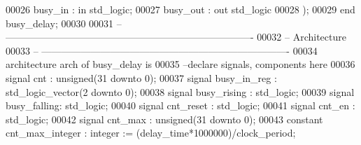 \begin{DoxyCode}
00026       \textcolor{vhdlchar}{busy_in}  \textcolor{vhdlchar}{:} \textcolor{keywordflow}{in}  \textcolor{comment}{std\_logic};
00027       \textcolor{vhdlchar}{busy_out} \textcolor{vhdlchar}{:} \textcolor{keywordflow}{out} \textcolor{comment}{std\_logic}
00028    \textcolor{vhdlchar}{)};
00029 \textcolor{keywordflow}{end} \textcolor{vhdlchar}{busy\_delay};
00030 
00031 \textcolor{keyword}{-- ----------------------------------------------------------------------------}
00032 \textcolor{keyword}{-- Architecture}
00033 \textcolor{keyword}{-- ----------------------------------------------------------------------------}
00034 \textcolor{keywordflow}{architecture} arch \textcolor{keywordflow}{of} busy_delay is
00035 \textcolor{keyword}{   --declare signals,  components here}
00036    \textcolor{keywordflow}{signal} \textcolor{vhdlchar}{cnt}         \textcolor{vhdlchar}{:} \textcolor{comment}{unsigned}\textcolor{vhdlchar}{(}\textcolor{vhdllogic}{}\textcolor{vhdllogic}{31} \textcolor{keywordflow}{downto} \textcolor{vhdllogic}{}\textcolor{vhdllogic}{0}\textcolor{vhdlchar}{)};
00037    \textcolor{keywordflow}{signal} \textcolor{vhdlchar}{busy_in_reg} \textcolor{vhdlchar}{:} \textcolor{comment}{std\_logic\_vector}\textcolor{vhdlchar}{(}\textcolor{vhdllogic}{}\textcolor{vhdllogic}{2} \textcolor{keywordflow}{downto} \textcolor{vhdllogic}{}\textcolor{vhdllogic}{0}\textcolor{vhdlchar}{)};
00038     \textcolor{keywordflow}{signal} \textcolor{vhdlchar}{busy_rising} \textcolor{vhdlchar}{:} \textcolor{comment}{std\_logic};
00039     \textcolor{keywordflow}{signal} \textcolor{vhdlchar}{busy_falling}\textcolor{vhdlchar}{:} \textcolor{comment}{std\_logic};
00040    \textcolor{keywordflow}{signal} \textcolor{vhdlchar}{cnt_reset}   \textcolor{vhdlchar}{:} \textcolor{comment}{std\_logic};
00041    \textcolor{keywordflow}{signal} \textcolor{vhdlchar}{cnt_en}      \textcolor{vhdlchar}{:} \textcolor{comment}{std\_logic};
00042    \textcolor{keywordflow}{signal} \textcolor{vhdlchar}{cnt_max}     \textcolor{vhdlchar}{:} \textcolor{comment}{unsigned}\textcolor{vhdlchar}{(}\textcolor{vhdllogic}{}\textcolor{vhdllogic}{31} \textcolor{keywordflow}{downto} \textcolor{vhdllogic}{}\textcolor{vhdllogic}{0}\textcolor{vhdlchar}{)};
00043     \textcolor{keywordflow}{constant}    \textcolor{vhdlchar}{cnt_max_integer} \textcolor{vhdlchar}{:} \textcolor{comment}{integer} \textcolor{vhdlchar}{:=} \textcolor{vhdlchar}{(}\textcolor{vhdlchar}{delay_time}\textcolor{vhdlchar}{*}\textcolor{vhdllogic}{}\textcolor{vhdllogic}{1000000}\textcolor{vhdlchar}{)}\textcolor{vhdlchar}{/}\textcolor{vhdlchar}{clock_period};

\end{DoxyCode}
